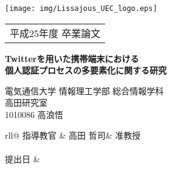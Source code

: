 \thispagestyle{empty}

\noindent
\texttt{[image: img/Lissajous\_UEC\_logo.eps]}\\
\begin{tabular}{c}
{\Large 平成25年度 卒業論文}				\\
\end{tabular}

\vspace{2.5cm}

\begin{center}
\LARGE \bf Twitterを用いた携帯端末における \\
個人認証プロセスの多要素化に関する研究 \\
\end{center}

\vspace{1.5cm}

\LARGE
\begin{flushright}
電気通信大学 情報理工学部 総合情報学科\\
高田研究室\\
1010086 高浪悟\\

\vspace{1.6zh}

{\def\arraystretch{0.6}
\begin{tabular}{rll@{}}
指導教官	& 高田 哲司& 准教授	\\
							\\
提出日	& 	\\
\end{tabular}
}
\end{flushright}
\normalsize
\newpage
